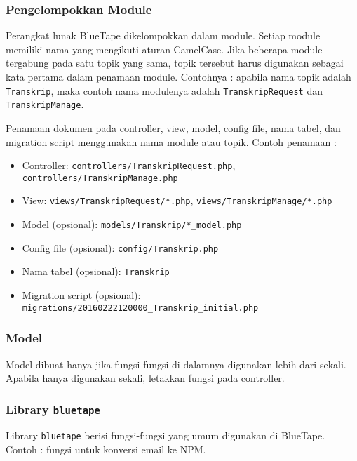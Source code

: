	\subsubsection{Pengelompokkan Module}
		Perangkat lunak BlueTape dikelompokkan dalam module. Setiap module memiliki nama yang mengikuti aturan CamelCase. Jika beberapa module tergabung pada satu topik yang sama, topik tersebut harus digunakan sebagai kata pertama dalam penamaan module. Contohnya : apabila nama topik adalah \texttt{Transkrip}, maka contoh nama modulenya adalah \texttt{TranskripRequest} dan \texttt{TranskripManage}.
		
		Penamaan dokumen pada controller, view, model, config file, nama tabel, dan migration script menggunakan nama module atau topik. Contoh penamaan :
		\begin{itemize}
			\item Controller: \texttt{controllers/TranskripRequest.php}, \texttt{controllers/TranskripManage.php}
			\item View: \texttt{views/TranskripRequest/*.php}, \texttt{views/TranskripManage/*.php}
			\item Model (opsional): \texttt{models/Transkrip/*\_model.php}
			\item Config file (opsional): \texttt{config/Transkrip.php}
			\item Nama tabel (opsional): \texttt{Transkrip}
			\item Migration script (opsional): \texttt{migrations/20160222120000\_Transkrip\_initial.php}
		\end{itemize} 
	
	\subsubsection{Model}
		Model dibuat hanya jika fungsi-fungsi di dalamnya digunakan lebih dari sekali. Apabila hanya digunakan sekali, letakkan fungsi pada controller.
	
	\subsubsection{Library \texttt{bluetape}}
		Library \texttt{bluetape} berisi fungsi-fungsi yang umum digunakan di BlueTape. Contoh : fungsi untuk konversi email ke NPM.
	
